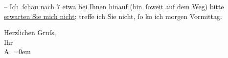 \pstart
           – Ich ſchau nach 7 etwa bei Ihnen hinauf (bin ſoweit auf dem Weg) bitte
                  \uline{erwarten Sie mich nicht}; treffe ich Sie nicht,{ }ſo
                  ko{\geminationm} ich mor{\pb}gen Vormittag.\pend
           
\pstart
           Herzlichen Gruſs,{\\[\baselineskip]} Ihr{\\[\baselineskip]}\spacefill\mbox{A.}\pend
           \leftskip=0em{}\endnumbering{}
\begin{anhang}
\end{anhang}\newcommand{\dateiname}{L04041}\newcommand{\titel}{Arthur Schnitzler an Gustav Schwarzkopf, [25. 9. 1902?]}\newcommand{\editorInnen}{Herausgegeben von Jahnke, SelmaMüller, Martin Anton}
